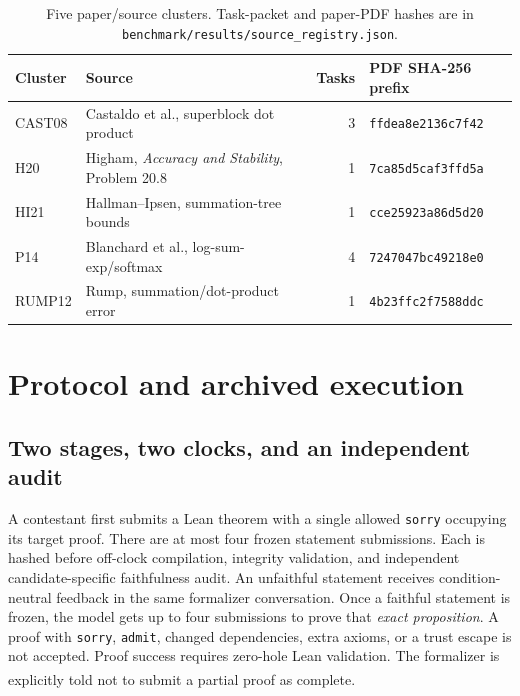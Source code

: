 \documentclass[10pt,a4paper]{article}
\newcommand{\src}[1]{\textsuperscript{\cite{#1}}}
\begin{document}
\begin{table}[ht]\centering\small
\begin{tabular}{@{}llrl@{}}\toprule
Cluster & Source & Tasks & PDF SHA-256 prefix\\\midrule
CAST08 & Castaldo et al., superblock dot product & 3 & \texttt{ffdea8e2136c7f42}\\
H20 & Higham, \emph{Accuracy and Stability}, Problem 20.8 & 1 & \texttt{7ca85d5caf3ffd5a}\\
HI21 & Hallman--Ipsen, summation-tree bounds & 1 & \texttt{cce25923a86d5d20}\\
P14 & Blanchard et al., log-sum-exp/softmax & 4 & \texttt{7247047bc49218e0}\\
RUMP12 & Rump, summation/dot-product error & 1 & \texttt{4b23ffc2f7588ddc}\\
\bottomrule\end{tabular}
\caption{Five paper/source clusters. Task-packet and paper-PDF hashes are
in \texttt{benchmark/results/source\_registry.json}.\cite{registry,packets}}
\label{tab:papers}
\end{table}

\section{Protocol and archived execution}

\subsection{Two stages, two clocks, and an independent audit}

A contestant first submits a Lean theorem with a single allowed
\texttt{sorry} occupying its target proof. There are at most four frozen
statement submissions. Each is hashed before off-clock compilation,
integrity validation, and independent candidate-specific faithfulness audit.
An unfaithful statement receives condition-neutral feedback in the same
formalizer conversation. Once a faithful statement is frozen, the model gets
up to four submissions to prove that \emph{exact proposition}. A proof with
\texttt{sorry}, \texttt{admit}, changed dependencies, extra axioms, or a trust
escape is not accepted. Proof success requires zero-hole Lean validation.
The formalizer is explicitly told not to submit a partial proof as complete.
\src{protocol,prompts,taskledger}
\end{document}
